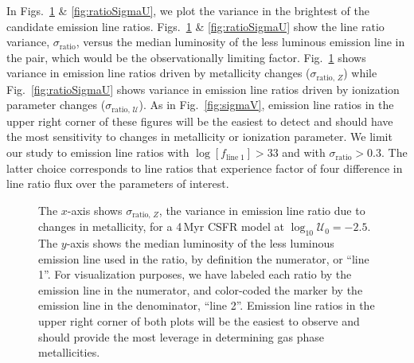 \documentclass[preprint2]{aastex61}
\newcommand{\sigmaR}{\ensuremath{\sigma_{\mathrm{ratio}}}\xspace}
\newcommand{\sigmaRU}{\ensuremath{\sigma_{\mathrm{ratio,}\,\mathcal{U}}}\xspace}
\newcommand{\sigmaRZ}{\ensuremath{\sigma_{\mathrm{ratio,}\,Z}}\xspace}
\newcommand{\Myr}{$\,$Myr\xspace}
\newcommand{\logten}{\ensuremath{\log_{10}}}
\newcommand{\logUeq}[1]{\ensuremath{\logten \mathcal{U}_0 = #1}}
\begin{document}
In Figs.~\ref{fig:ratioSigmaZ} \& \ref{fig:ratioSigmaU}, we plot the variance in the brightest of the candidate emission line ratios. Figs.~\ref{fig:ratioSigmaZ} \& \ref{fig:ratioSigmaU} show the line ratio variance, \sigmaR, versus the median luminosity of the less luminous emission line in the pair, which would be the observationally limiting factor. Fig.~\ref{fig:ratioSigmaZ} shows variance in emission line ratios driven by metallicity changes (\sigmaRZ) while Fig.~\ref{fig:ratioSigmaU} shows variance in emission line ratios driven by ionization parameter changes (\sigmaRU). As in Fig.~\ref{fig:sigmaV}, emission line ratios in the upper right corner of these figures will be the easiest to detect and should have the most sensitivity to changes in metallicity or ionization parameter. We limit our study to emission line ratios with $\log[ f_{\mathrm{line\;1}} ] > 33 $ and with \sigmaR $> 0.3$. The latter choice corresponds to line ratios that experience factor of four difference in line ratio flux over the parameters of interest.

\begin{figure}
  \begin{center}
    \caption{The $x$-axis shows \sigmaRZ, the variance in emission line ratio due to changes in metallicity, for a 4\Myr CSFR model at \logUeq{-2.5}. The $y$-axis shows the median luminosity of the less luminous emission line used in the ratio, by definition the numerator, or ``line 1''. For visualization purposes, we have labeled each ratio by the emission line in the numerator, and color-coded the marker by the emission line in the denominator, ``line 2''.  Emission line ratios in the upper right corner of both plots will be the easiest to observe and should provide the most leverage in determining gas phase metallicities.}
    \label{fig:ratioSigmaZ}
  \end{center}
\end{figure}
\end{document}
